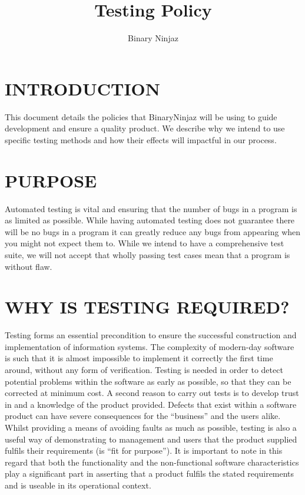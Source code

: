 \documentclass[12pt]{article}
\title{Testing Policy}
\author{Binary Ninjaz}
\date{}
\begin{document}
  \maketitle
  \newpage
  
  \tableofcontents
  \newpage
  
  \section{INTRODUCTION}
  This document details the policies that BinaryNinjaz will be using to guide development and ensure a quality product. We describe why we intend to use specific testing methods and how their effects will impactful in our process. 
  
  \section{PURPOSE}
  Automated testing is vital and ensuring that the number of bugs in a program is as limited as possible. While having automated testing does not guarantee there will be no bugs in a program it can greatly reduce any bugs from appearing when you might not expect them to. While we intend to have a comprehensive test suite, we will not accept that wholly passing test cases mean that a program is without flaw.

\section{WHY IS TESTING REQUIRED?}
Testing forms an essential precondition to ensure the successful construction and implementation of information systems. The complexity of modern-day software is such that it is almost impossible to implement it correctly the first time around, without any form of verification. Testing is needed in order to detect potential problems within the software as early as possible, so that they can be corrected at minimum cost.  A second reason to carry out tests is to develop trust in and a knowledge of the product provided. Defects that exist within a software product can have severe consequences for the “business” and the users alike.  Whilst providing a means of avoiding faults as much as possible, testing is also a useful way of demonstrating to management and users that the product supplied fulfils their requirements (is “fit for purpose”). It is important to note in this regard that both the functionality and the non-functional software characteristics play a significant part in asserting that a product fulfils the stated requirements and is useable in its operational context. 
\end{document}
